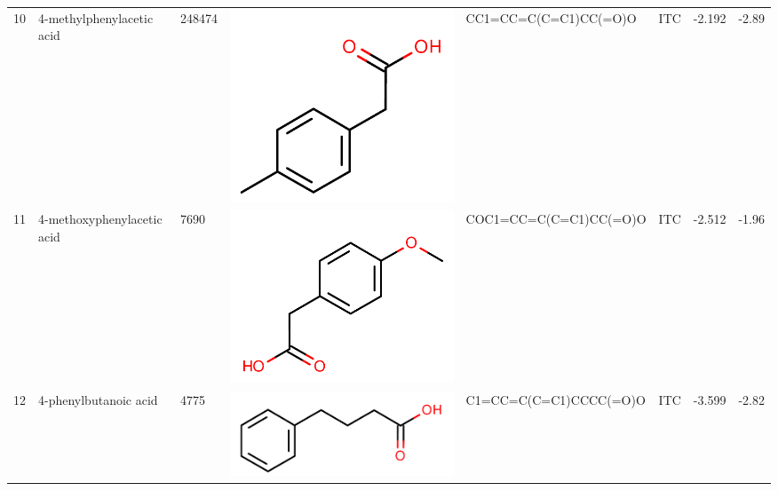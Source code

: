 \documentclass[aps,pre,twocolumn,nofootinbib,superscriptaddress,10pt, final,tightenlines]{revtex4-1}
\begin{document}
\begin{table}
\begin{tabular}{lllp{2cm}>{\ttfamily}llS[table-format=-1.3, table-figures-uncertainty=1]S[table-format=-1.2, table-figures-uncertainty=1]}
10   & 4-methylphenylacetic acid   & 248474   & \parbox[c]{1em}{\includegraphics[scale=0.2]{figures/248474.pdf}} & CC1=CC=C(C=C1)CC(=O)O   & ITC    & -2.192   & -2.89  \\
11   & 4-methoxyphenylacetic acid  & 7690     & \parbox[c]{1em}{\includegraphics[scale=0.2]{figures/7690.pdf}}   & COC1=CC=C(C=C1)CC(=O)O  & ITC    & -2.512   & -1.96  \\
12   & 4-phenylbutanoic acid       & 4775     & \parbox[c]{1em}{\includegraphics[scale=0.2]{figures/4775.pdf}}   & C1=CC=C(C=C1)CCCC(=O)O  & ITC    & -3.599   & -2.82  \\

\end{tabular}
\end{table}
\end{document}
